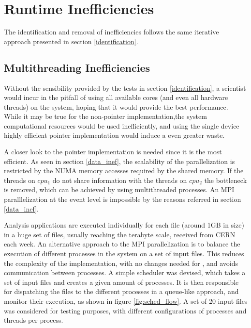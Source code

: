 \section{Runtime Inefficiencies}
\label{removal}

The identification and removal of inefficiencies follows the same iterative approach presented in section \ref{identification}.

\subsection{Multithreading Inefficiencies}

Without the sensibility provided by the tests in section \ref{identification}, a scientist would incur in the pitfall of using all available cores (and even all hardware threads) on the system, hoping that it would provide the best performance. While it may be true for the non-pointer implementation,the system computational resources would be used inefficiently, and using the single device highly efficient pointer implementation would induce a even greater waste.

A closer look to the pointer implementation is needed since it is the most efficient. As seen in section \ref{data_inef}, the scalability of the parallelization is restricted by the NUMA memory accesses required by the shared memory. If the threads on $cpu_1$ do not share information with the threads on $cpu_2$ the bottleneck is removed, which can be achieved by using multithreaded processes. An MPI paralllelization at the event level is impossible by the reasons referred in section \ref{data_inef}.

Analysis applications are executed individually for each file (around 1GB in size) in a huge set of files, usually reaching the terabyte scale, received from CERN each week. An alternative approach to the MPI parallelization is to balance the execution of different \tth processes in the system on a set of input files. This reduces the complexity of the implementation, with no changes needed for \tth, and avoids communication between processes. A simple scheduler was devised, which takes a set of input files and creates a given amount of \tth processes. It is then responsible for dispatching the files to the different processes in a queue-like approach, and monitor their execution, as shown in figure \ref{fig:sched_flow}. A set of 20 input files was considered for testing purposes, with different configurations of processes and threads per process.

